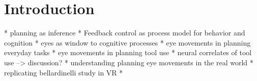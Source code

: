 \section{Introduction}

* planning as inference
* Feedback control as process model for behavior and cognition
* eyes as window to cognitive processes
* eye movements in planning everyday tasks
* eye movements in planning tool use 
* neural correlates of tool use --> discussion?
* understanding planning eye movements in the real world
* replicating bellardinelli study in VR
* 
